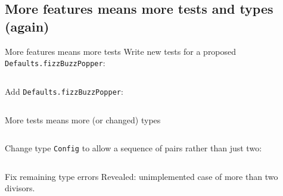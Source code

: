 
\subsection{More features means more tests and types (again)}

\begin{frame}[fragile]{More features means more tests}
  Write new tests for a proposed \texttt{Defaults.fizzBuzzPopper}:

  \inputminted[gobble=2]{scala}{FizzBuzzSpec5.scala}

  Add \texttt{Defaults.fizzBuzzPopper}:
  \inputminted[gobble=2]{scala}{Defaults2.scala}
\end{frame}

\begin{frame}[fragile]{More tests means more (or changed) types}
  \inputminted{console}{testQuick8.console}

  Change \alert{type} \texttt{Config} to allow a sequence of pairs rather than just two:

  \inputminted[gobble=2]{scala}{FizzBuzz3Seq.scala}

\end{frame}

\begin{frame}[fragile]{Fix remaining type errors}
  Revealed: unimplemented case of more than two divisors.

  \inputminted[gobble=2]{scala}{FizzBuzz3SeqCompile.scala}
\end{frame}

